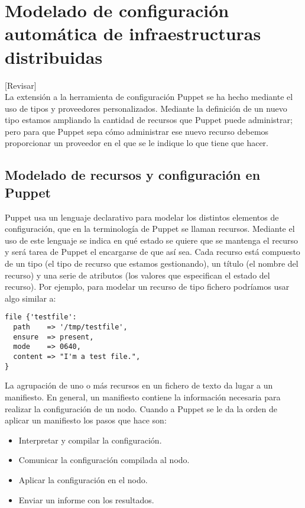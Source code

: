 \chapter{Modelado de configuración automática de infraestructuras distribuidas}
\label{cap:modelado}

[Revisar]\\

La extensión a la herramienta de configuración Puppet se ha hecho mediante el uso de tipos y proveedores personalizados. Mediante la definición de un nuevo tipo estamos ampliando la cantidad de recursos que Puppet puede administrar; pero para que Puppet sepa cómo administrar ese nuevo recurso debemos proporcionar un proveedor en el que se le indique lo que tiene que hacer.


\section{Modelado de recursos y configuración en Puppet}

Puppet usa un lenguaje declarativo para modelar los distintos elementos de configuración, que en la terminología de Puppet se llaman recursos. Mediante el uso de este lenguaje se indica en qué estado se quiere que se mantenga el recurso y será tarea de Puppet el encargarse de que así sea. Cada recurso está compuesto de un tipo (el tipo de recurso que estamos gestionando), un título (el nombre del recurso) y una serie de atributos (los valores que especifican el estado del recurso). Por ejemplo, para modelar un recurso de tipo fichero podríamos usar algo similar a:

\begin{lstlisting}
file {'testfile':
  path    => '/tmp/testfile',
  ensure  => present,
  mode    => 0640,
  content => "I'm a test file.",
}
\end{lstlisting}

La agrupación de uno o más recursos en un fichero de texto da lugar a un manifiesto. En general, un manifiesto contiene la información necesaria para realizar la configuración de un nodo. Cuando a Puppet se le da la orden de aplicar un manifiesto los pasos que hace son:
\begin{itemize}
\item Interpretar y compilar la configuración.
\item Comunicar la configuración compilada al nodo.
\item Aplicar la configuración en el nodo.
\item Enviar un informe con los resultados.
\end{itemize}


